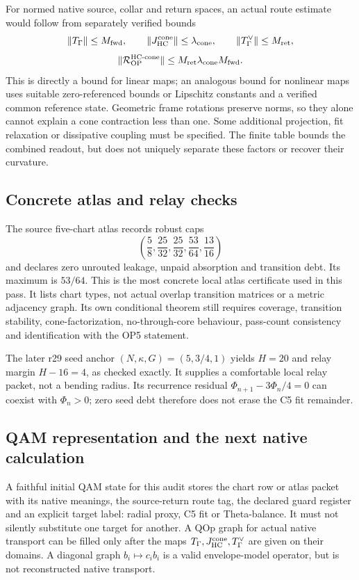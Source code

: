 \documentclass[11pt,a4paper]{article}
\begin{document}
For normed native source, collar and return spaces, an actual route estimate
would follow from separately verified bounds
\[
\|T_\Gamma\|\le M_{\rm fwd},\qquad
\|J_{\rm HC}^{\rm cone}\|\le\lambda_{\rm cone},\qquad
\|T_\Gamma^\vee\|\le M_{\rm ret},
\]
\[
\|\mathcal R_{\rm OP}^{\rm HC\text{-}cone}\|
\le M_{\rm ret}\lambda_{\rm cone}M_{\rm fwd}.
\]
This is directly a bound for linear maps; an analogous bound for nonlinear
maps uses suitable zero-referenced bounds or Lipschitz constants and a
verified common reference state. Geometric frame rotations preserve norms,
so they alone cannot explain a cone contraction less than one. Some
additional projection, fit relaxation or dissipative coupling must be
specified. The finite table bounds the combined readout, but does not
uniquely separate these factors or recover their curvature.

\subsection{Concrete atlas and relay checks}
The source five-chart atlas records robust caps
\[
\left(\frac58,\frac{25}{32},\frac{25}{32},\frac{53}{64},
\frac{13}{16}\right)
\]
and declares zero unrouted leakage, unpaid absorption and transition debt.
Its maximum is $53/64$. This is the most concrete local atlas certificate
used in this pass. It lists chart types, not actual overlap transition
matrices or a metric adjacency graph. Its own conditional theorem still
requires coverage, transition stability, cone-factorization, no-through-core
behaviour, pass-count consistency and identification with the OP5 statement.

The later r29 seed anchor $(N,\kappa,G)=(5,3/4,1)$ yields
$H=20$ and relay margin $H-16=4$, as checked exactly. It supplies a
comfortable local relay packet, not a bending radius. Its recurrence
residual $\Phi_{n+1}-3\Phi_n/4=0$ can coexist with $\Phi_n>0$;
zero seed debt therefore does not erase the C5 fit remainder.

\subsection{QAM representation and the next native calculation}
A faithful initial QAM state for this audit stores the chart row or atlas
packet with its native meanings, the source-return route tag, the declared
guard register and an explicit target label: radial proxy, C5 fit or
Theta-balance. It must not silently substitute one target for another.
A QOp graph for actual native transport can be filled only after the maps
$T_\Gamma,J_{\rm HC}^{\rm cone},T_\Gamma^\vee$ are given on their
domains. A diagonal graph $b_i\mapsto c_i b_i$ is a valid envelope-model
operator, but is not reconstructed native transport.
\end{document}
